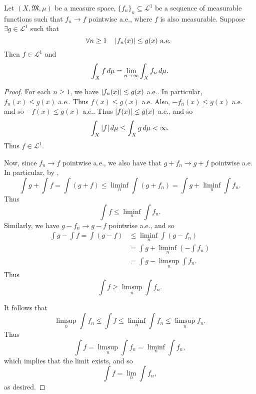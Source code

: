\documentclass[notoc,notitlepage]{tufte-book}
\begin{document}
\begin{thm}\label{thm:lebesgue_s_dominated_convergence_theorem}
  Let $(X, \mathfrak{M}, \mu)$ be a measure space,
  $\{ f_n \}_{n} \subseteq \mathcal{L}^1$ be a sequence of measurable functions
  such that $f_n \to f$ pointwise a.e., where $f$ is also measurable.
  Suppose $\exists g \in \mathcal{L}^1$ such that
  \begin{equation*}
    \forall n \geq 1\quad \left|f_n(x)\right| \leq g(x) \text{ a.e. }
  \end{equation*}
  Then $f \in \mathcal{L}^1$ and
  \begin{equation*}
    \int_{X} f \mathop{}\!d{\mu} = \lim_{n \to \infty} \int_{X} f_n \mathop{}\!d{\mu}.
  \end{equation*}
\end{thm}

\begin{proof}
  For each $n \geq 1$, we have $\left|f_n(x)\right| \leq g(x)$ a.e..
  In particular, $f_n(x) \leq g(x)$ a.e..
  Thus $f(x) \leq g(x)$ a.e.
  Also, $-f_n(x) \leq g(x)$ a.e. and so $-f(x) \leq g(x)$ a.e..
  Thus $\left|f(x)\right| \leq g(x)$ a.e., and so
  \begin{equation*}
    \int_{X} \left|f\right| \mathop{}\!d{\mu} \leq \int_{X} g \mathop{}\!d{\mu} < \infty.
  \end{equation*}
  Thus $f \in \mathcal{L}^1$.

  Now, since $f_n \to f$ pointwise a.e.,
  we also have that $g + f_n \to g + f$ pointwise a.e.
  In particular, by ,
  \begin{equation*}
    \int g + \int f = \int (g + f)
    \leq \liminf_{n} \int (g + f_n)
    = \int g + \liminf_{n} \int f_n.
  \end{equation*}
  Thus
  \begin{equation*}
    \int f \leq \liminf_n \int f_n.
  \end{equation*}
  Similarly, we have $g - f_n \to g - f$ pointwise a.e., and so
  \begin{align*}
    \int g - \int f = \int (g - f)
    &\leq \liminf_n \int (g - f_n) \\
    &= \int g + \liminf_n \left( - \int f_n \right) \\
    &= \int g - \limsup_n \int f_n.
  \end{align*}
  Thus
  \begin{equation*}
    \int f \geq \limsup_n \int f_n.
  \end{equation*}

  It follows that
  \begin{equation*}
    \limsup_n \int f_n \leq \int f \leq \liminf_n \int f_n \leq \limsup_n f_n.
  \end{equation*}
  Thus
  \begin{equation*}
    \int f = \limsup_n \int f_n = \liminf_n \int f_n,
  \end{equation*}
  which implies that the limit exists, and so
  \begin{equation*}
    \int f = \lim_n \int f_n,
  \end{equation*}
  as desired.
\end{proof}
\end{document}

